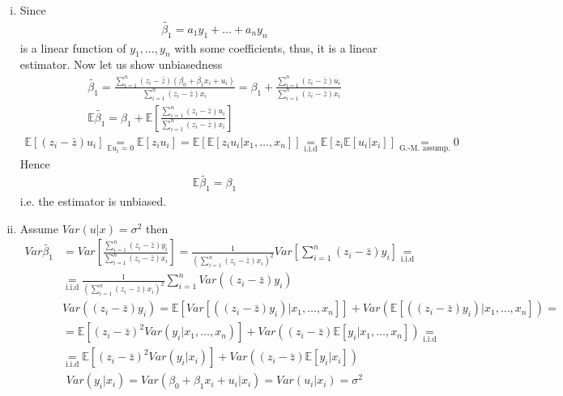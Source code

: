 \documentclass[a4paper]{article}
\newcommand{\expect}{\mathbb{E}}
\begin{document}
\begin{enumerate}[(i)]
	\item Since 
	\begin{align*}
	\tilde{\beta_1} = a_1 y_1 + \dots + a_ny_n
	\end{align*}
	is a linear function of $y_1, \dots, y_n$ with some coefficients, thus, it is a linear estimator. Now let us show unbiasedness  
	\begin{align*}
	\tilde{\beta_1} = \frac{\sum_{i=1}^n (z_i - \bar{z})(\beta_0 + \beta_1 x_i + u_i)}{\sum_{i=1}^n(z_i - \bar{z})x_i} = \beta_1 + \frac{\sum_{i=1}^n(z_i - \bar{z})u_i}{\sum_{i=1}^n(z_i - \bar{z})x_i}\\
	\expect \tilde{\beta_1} = \beta_1 + \expect \left[\frac{\sum_{i=1}^n(z_i - \bar{z})u_i}{\sum_{i=1}^n(z_i - \bar{z})x_i}\right]
	\end{align*}
	\begin{align*}
	\expect[(z_i - \bar{z})u_i] \underset{\expect u_i = 0}{ = } \expect[z_iu_i] = \expect[\expect[z_iu_i|x_1, \dots, x_n]] \underset{\text{i.i.d}}{ = } \expect[z_i\expect[u_i|x_i]] \underset{\text{G.-M. assump.}}{ = } 0 
	\end{align*}
	Hence 
	\begin{align*}
	\expect \tilde{\beta_1} = \beta_1
	\end{align*}
	i.e. the estimator is unbiased.
	\item Assume $Var(u|x) = \sigma^2$ then
	\begin{align*}
	Var \tilde{\beta_1} &= Var\left[\frac{\sum_{i=1}^n (z_i - \bar{z})y_i}{\sum_{i=1}^n (z_i - \bar{z})x_i}\right] = \frac{1}{\left(\sum_{i=1}^n (z_i - \bar{z})x_i\right)^2} Var\left[\sum_{i=1}^n (z_i - \bar{z})y_i\right] \underset{\text{i.i.d}}{=}\\
	&\underset{\text{i.i.d}}{=}\frac{1}{\left(\sum_{i=1}^n (z_i - \bar{z})x_i\right)^2} \sum_{i=1}^n Var((z_i - \bar{z})y_i)\\
	&Var((z_i - \bar{z})y_i) = \expect[Var[((z_i - \bar{z})y_i)|x_1, \dots, x_n]] + Var(\expect[((z_i - \bar{z})y_i)|x_1, \dots, x_n]) = \\
	&=\expect[(z_i - \bar{z})^2 Var(y_i|x_1, \dots, x_n)] + Var((z_i - \bar{z})\expect[y_i|x_1, \dots, x_n]) \underset{\text{i.i.d}}{=}\\
	&\underset{\text{i.i.d}}{=} \expect[(z_i-\bar{z})^2 Var(y_i|x_i)] + Var((z_i - \bar{z})\expect[y_i|x_i])
	\end{align*}
	\begin{align*}
	Var(y_i|x_i) = Var(\beta_0 + \beta_1x_i + u_i|x_i) = Var(u_i|x_i) = \sigma^2\\

\end{align*}
\end{enumerate}
\end{document}
